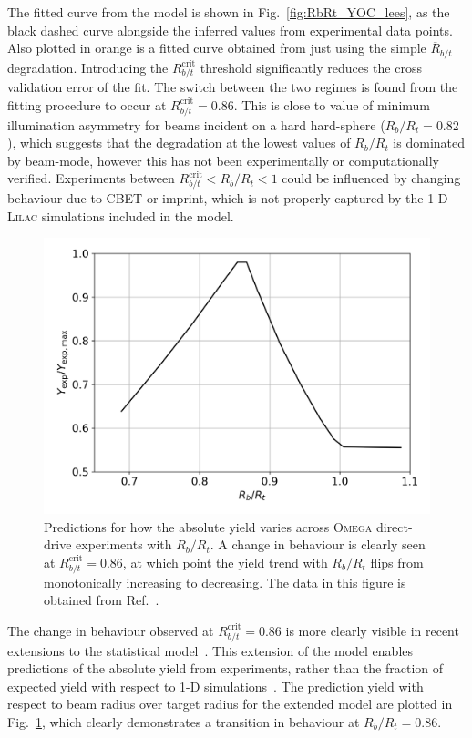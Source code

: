 The fitted curve from the model is shown in Fig.~\ref{fig:RbRt_YOC_lees}, as the black dashed curve alongside the inferred values from experimental data points.
Also plotted in orange is a fitted curve obtained from just using the simple $\overline{R}_{b/t}$ degradation.
Introducing the $R_{b/t}^{\text{crit}}$ threshold significantly reduces the cross validation error of the fit.
The switch between the two regimes is found from the fitting procedure to occur at $R_{b/t}^{\text{crit}}=0.86$.
This is close to value of minimum illumination asymmetry for beams incident on a hard hard-sphere ($R_b/R_t=0.82$), which suggests that the degradation at the lowest values of $R_b/R_t$ is dominated by beam-mode, however this has not been experimentally or computationally verified.
Experiments between $R_{b/t}^{\text{crit}} < R_b/R_t < 1$ could be influenced by changing behaviour due to \ac{CBET} or imprint, which is not properly captured by the 1-D \textsc{Lilac} simulations included in the model.

\begin{figure}[t!]
    \includegraphics[width=0.7\linewidth]{Results1/Images/New_stat_model_Y_vs_RbRt.png}
    \centering
    \caption{Predictions for how the absolute yield varies across \textsc{Omega} direct-drive experiments with $R_b/R_t$.
    A change in behaviour is clearly seen at $R_{b/t}^{\text{crit}}=0.86$, at which point the yield trend with $R_b/R_t$ flips from monotonically increasing to decreasing.
    The data in this figure is obtained from Ref.~\cite{ejaz_can_2024}.}%
    \label{fig:RbRt_Y_ejaz}
\end{figure}

The change in behaviour observed at $R_{b/t}^{\text{crit}}=0.86$ is more clearly visible in recent extensions to the statistical model~\cite{ejaz_can_2024}.
This extension of the model enables predictions of the absolute yield from experiments, rather than the fraction of expected yield with respect to 1-D simulations~\cite{ejaz_can_2024}.
The prediction yield with respect to beam radius over target radius for the extended model are plotted in Fig.~\ref{fig:RbRt_Y_ejaz}, which clearly demonstrates a transition in behaviour at $R_b/R_t=0.86$.

